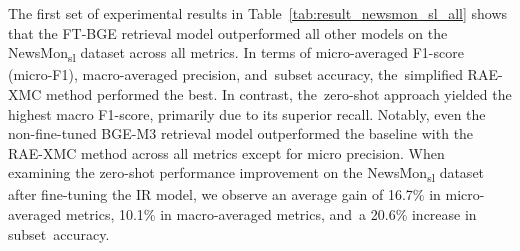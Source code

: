 \documentclass[make,article,accept,pdftex,moreauthors]{Definitions/mdpi}
\begin{document}
The first set of experimental results in Table~\ref{tab:result_newsmon_sl_all} shows that the FT-BGE retrieval model outperformed all other models on the NewsMon\textsubscript{sl} dataset across all metrics.
In terms of micro-averaged F1-score (micro-F1), macro-averaged precision, and~subset accuracy, the~simplified RAE-XMC method performed the best.
In contrast, the~zero-shot approach yielded the highest macro F1-score, primarily due to its superior recall.
Notably, even the non-fine-tuned BGE-M3 retrieval model outperformed the baseline with the RAE-XMC method across all metrics except for micro precision.
When examining the zero-shot performance improvement on the NewsMon\textsubscript{sl} dataset after fine-tuning the IR model, we observe an average gain of 16.7\% in micro-averaged metrics, 10.1\% in macro-averaged metrics, and~a 20.6\% increase in subset~accuracy.
\end{document}
